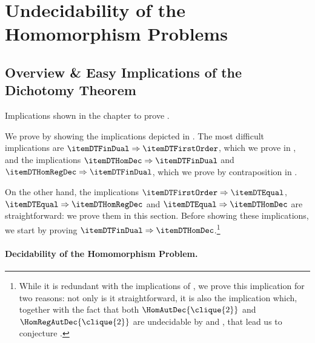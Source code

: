 \section{Undecidability of the Homomorphism Problems}
\AP\label{sec:dichotomy-undecidability}

\subsection{Overview \& Easy Implications of the Dichotomy Theorem}
\AP\label{sec:dichotomy-overview}

\DichotomyThmDichotomyAutomatic

\begin{marginfigure}
	\centering
	\begin{tikzpicture}
		
	\end{tikzpicture}
	\caption{\AP\label{fig:dichotomy-overview}Implications shown in the chapter to prove
	.}
\end{marginfigure}
We prove  by showing the
implications depicted in .
The most difficult implications are $\itemDTFinDual \Rightarrow \itemDTFirstOrder$,
which we prove in , and the implications
$\itemDTHomDec \Rightarrow \itemDTFinDual$ and $\itemDTHomRegDec \Rightarrow \itemDTFinDual$,
which we prove by contraposition in .

On the other hand, the implications $\itemDTFirstOrder \Rightarrow \itemDTEqual$,
$\itemDTEqual \Rightarrow \itemDTHomRegDec$ and $\itemDTEqual \Rightarrow \itemDTHomDec$ are straightforward: we prove them in this section. 
Before showing these implications, we start by proving $\itemDTFinDual \Rightarrow \itemDTHomDec$.\footnote{While it is redundant with the implications of , 
we prove this implication for two reasons: not only is it straightforward, it is also
the implication which, together with the fact that both $\HomAutDec{\clique{2}}$
and $\HomRegAutDec{\clique{2}}$ are undecidable by
\cite[Proposition 6.5]{Kocher2014AutomatischenGraphen}
and \cite[Theorem 4.4]{BarceloFigueiraMorvan2023SeparatingAutomatic}, that lead us to conjecture
.}

\paragraph*{Decidability of the Homomorphism Problem.}


